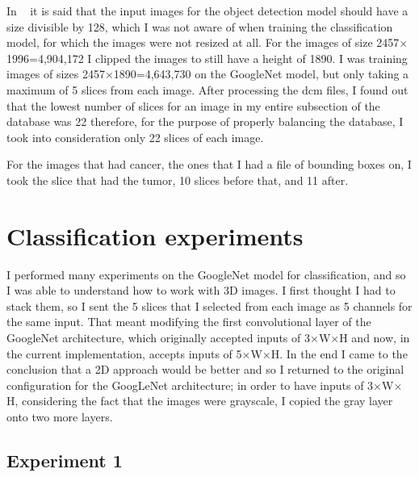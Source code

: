 In ~\cite{carte8} it is said that the input images for the object detection model should have a size divisible by 128, which I was not aware of when training the classification model, for which the images were not resized at all. For the images of size 2457$\times$1996=4,904,172 I clipped the images to still have a height of 1890. I was training images of sizes 2457$\times$1890=4,643,730 on the GoogleNet model, but only taking a maximum of 5 slices from each image. After processing the dcm files, I found out that the lowest number of slices for an image in my entire subsection of the database was 22 therefore, for the purpose of properly balancing the database, I took into consideration only 22 slices of each image. 
 
For the images that had cancer, the ones that I had a file of bounding boxes on, I took the slice that had the tumor, 10 slices before that, and 11 after.

\section{Classification experiments}

I performed many experiments on the GoogleNet model for classification, and so I was able to understand how to work with 3D images. I first thought I had to stack them, so I sent the 5 slices that I selected from each image as 5 channels for the same input. That meant modifying the first convolutional layer of the GoogleNet architecture, which originally  accepted inputs of 3$\times$W$\times$H and now, in the current implementation, accepts inputs of 5$\times$W$\times$H. In the end I came to the conclusion that a 2D approach would be better and so I returned to the original configuration for the GoogLeNet architecture; in order to have inputs of 3$\times$W$\times$H, considering the fact that the images were grayscale, I copied the gray layer onto two more layers.

\subsection{Experiment 1}

